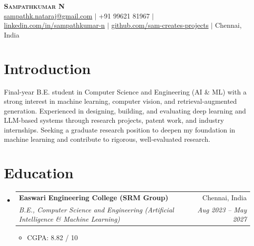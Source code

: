 \documentclass[letterpaper,10pt]{article}
\makeatletter
\newcommand{\resumeItem}[1]{
  \item\small{#1 \vspace{-2pt}}
}
\newcommand{\resumeSubheading}[4]{
  \vspace{-2pt}\item
    \begin{tabular*}{0.98\textwidth}[t]{l@{\extracolsep{\fill}}r}
      \textbf{#1} & #2 \\
      \textit{\small#3} & \textit{\small #4} \\
    \end{tabular*}\vspace{-7pt}
}
\newcommand{\resumeSubHeadingListStart}{\begin{itemize}[leftmargin=0.0in, label={}]}
\newcommand{\resumeSubHeadingListEnd}{\end{itemize}}
\newcommand{\resumeItemListStart}{\begin{itemize}[leftmargin=*, itemsep=1pt]}
\newcommand{\resumeItemListEnd}{\end{itemize}\vspace{-5pt}}
\makeatother
\begin{document}
\begin{center}
    \textbf{\Huge \scshape Sampathkumar N} \\ \vspace{2pt}
    \small
    \href{mailto:sampathk.nataraj@gmail.com}{sampathk.nataraj@gmail.com} $|$
    +91 99621 81967 $|$
    \href{https://linkedin.com/in/sampathkumar-n}{linkedin.com/in/sampathkumar-n} $|$
    \href{https://github.com/sam-creates-projects}{github.com/sam-creates-projects} $|$
    Chennai, India
\end{center}

\section{Introduction}
\small{Final-year B.E. student in Computer Science and Engineering (AI \& ML) with a strong interest in machine learning, computer vision, and retrieval-augmented generation. Experienced in designing, building, and evaluating deep learning and LLM-based systems through research projects, patent work, and industry internships. Seeking a graduate research position to deepen my foundation in machine learning and contribute to rigorous, well-evaluated research.}

\section{Education}
  \resumeSubHeadingListStart
    \resumeSubheading
      {Easwari Engineering College (SRM Group)}{Chennai, India}
      {B.E., Computer Science and Engineering (Artificial Intelligence \& Machine Learning)}{Aug 2023 -- May 2027}
    \resumeItemListStart
      \resumeItem{CGPA: 8.82 / 10}
    \resumeItemListEnd
  \resumeSubHeadingListEnd

\end{document}
